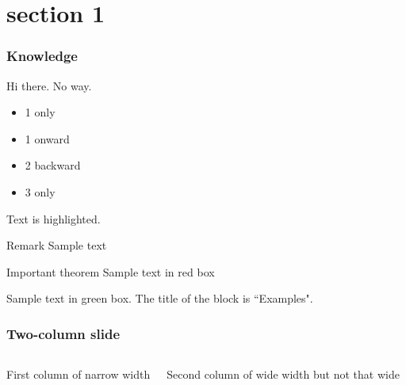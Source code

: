 \section{section 1}

\begin{frame}
    \frametitle{Knowledge}
    Hi there.
    No way.
    \begin{itemize}
       \item<1>1 only
       \item<1->1 onward
       \item<-2>2 backward
       \item<3>3 only
    \end{itemize}

    Text is \alert{highlighted}.

    \begin{block}{Remark}
    Sample text
    \end{block}

    \begin{alertblock}{Important theorem}
    Sample text in red box
    \end{alertblock}

    \begin{examples}
    Sample text in green box. The title of the block is ``Examples".
    \end{examples}
\end{frame}

\begin{frame}
    \frametitle{Two-column slide}
    \begin{columns}
        First column of narrow width
        
        Second column of wide width but not that wide
    \end{columns}
\end{frame}
